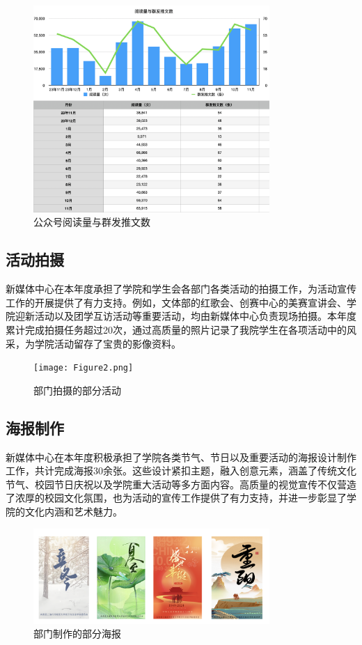 \documentclass{article}
\begin{document}
\begin{figure} [H]
    \centering
    \includegraphics[width=0.8\textwidth]{Figure1.png} %
    \caption{公众号阅读量与群发推文数} %
    \label{fig:example} %
\end{figure}

\subsection{活动拍摄}
新媒体中心在本年度承担了学院和学生会各部门各类活动的拍摄工作，为活动宣传工作的开展提供了有力支持。例如，文体部的红歌会、创赛中心的美赛宣讲会、学院迎新活动以及团学互访活动等重要活动，均由新媒体中心负责现场拍摄。本年度累计完成拍摄任务超过20次，通过高质量的照片记录了我院学生在各项活动中的风采，为学院活动留存了宝贵的影像资料。
\begin{figure} [H]
    \centering
    \texttt{[image: Figure2.png]} %
    \caption{部门拍摄的部分活动} %
    \label{fig:example} %
\end{figure}
\subsection{海报制作}
新媒体中心在本年度积极承担了学院各类节气、节日以及重要活动的海报设计制作工作，共计完成海报30余张。这些设计紧扣主题，融入创意元素，涵盖了传统文化节气、校园节日庆祝以及学院重大活动等多方面内容。高质量的视觉宣传不仅营造了浓厚的校园文化氛围，也为活动的宣传工作提供了有力支持，并进一步彰显了学院的文化内涵和艺术魅力。
\begin{figure} [H]
    \centering
    \includegraphics[width=0.8\textwidth]{Figure3.png} %
    \caption{部门制作的部分海报} %
    \label{fig:example} %
\end{figure}
\end{document}
